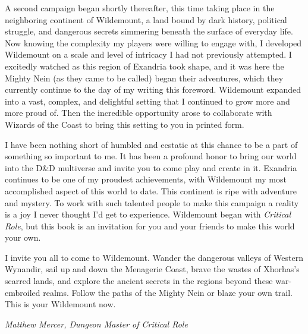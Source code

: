 \documentclass[10pt,a4paper,twoside,bg=print,twocolumn,openany,nodeprecatedcode]{dndbook}
\begin{document}
\begin{DndReadAloud}{}
A second campaign began shortly thereafter, this time taking place in the neighboring continent of Wildemount, a land bound by dark history, political struggle, and dangerous secrets simmering beneath the surface of everyday life. Now knowing the complexity my players were willing to engage with, I developed Wildemount on a scale and level of intricacy I had not previously attempted. I excitedly watched as this region of Exandria took shape, and it was here the Mighty Nein (as they came to be called) began their adventures, which they currently continue to the day of my writing this foreword. Wildemount expanded into a vast, complex, and delightful setting that I continued to grow more and more proud of. Then the incredible opportunity arose to collaborate with Wizards of the Coast to bring this setting to you in printed form.

I have been nothing short of humbled and ecstatic at this chance to be a part of something so important to me. It has been a profound honor to bring our world into the D\&D multiverse and invite you to come play and create in it. Exandria continues to be one of my proudest achievements, with Wildemount my most accomplished aspect of this world to date. This continent is ripe with adventure and mystery. To work with such talented people to make this campaign a reality is a joy I never thought I'd get to experience. Wildemount began with \textit{Critical Role}, but this book is an invitation for you and your friends to make this world your own.

I invite you all to come to Wildemount. Wander the dangerous valleys of Western Wynandir, sail up and down the Menagerie Coast, brave the wastes of Xhorhas's scarred lands, and explore the ancient secrets in the regions beyond these war-embroiled realms. Follow the paths of the Mighty Nein or blaze your own trail. This is your Wildemount now.

\textit{Matthew Mercer, Dungeon Master of Critical Role}

\end{DndReadAloud}
\end{document}
